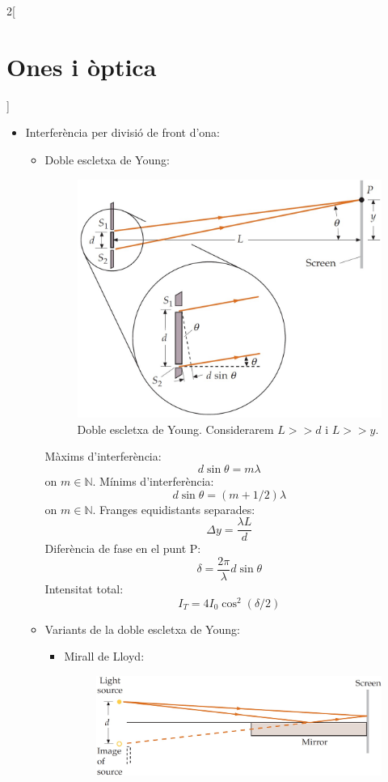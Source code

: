 \documentclass[class=article,10pt,crop=false]{standalone}
\begin{document}
\begin{multicols}{2}[\section{Ones i òptica}]
\begin{itemize}
\begin{itemize}
\begin{itemize}
\begin{figure}[ht]
                \caption{}
            \end{figure}
        \end{itemize}
    \end{itemize}
    \item Interferència per divisió de front d'ona:
    \begin{itemize}
        \item Doble escletxa de Young:\newline
        \begin{figure}[ht]
            \includegraphics[width=\linewidth]{Physics/1st/Ones_i_optica/Imatges/young.jpg} 
            \caption{Doble escletxa de Young. Considerarem $L>>d$ i $L>>y$.}
        \end{figure}
Màxims d'interferència: $$d\sin\theta=m\lambda$${\footnotesize on $m\in\mathbb{N}$.}\newline 
Mínims d'interferència: $$d\sin\theta=(m+1/2)\lambda$$ {\footnotesize on $m\in\mathbb{N}$.}\newline 
Franges equidistants separades: $$\Delta y=\frac{\lambda L}{d}$$
Diferència de fase en el punt P:
        $$\delta=\frac{2\pi}{\lambda}d\sin\theta$$
        Intensitat total: $$I_T=4I_0\cos^2(\delta/2)$$
        \item Variants de la doble escletxa de Young:
    \begin{itemize}
        \item Mirall de Lloyd:\newline
        \begin{figure}[ht]
            \includegraphics[width=\linewidth]{Physics/1st/Ones_i_optica/Imatges/lloyd.jpg} 

\end{figure}
\end{itemize}
\end{itemize}
\end{itemize}
\end{multicols}
\end{document}
